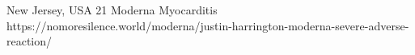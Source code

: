           {New Jersey, USA}
          {21}
          {Moderna}
          {}
          {
            Myocarditis
          }
          {https://nomoresilence.world/moderna/justin-harrington-moderna-severe-adverse-reaction/}


